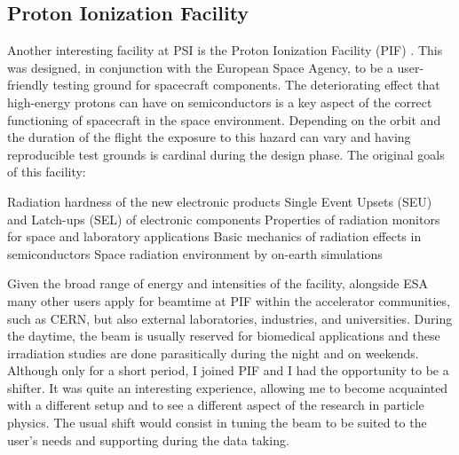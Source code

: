\begin{refsection}
\section{Proton Ionization Facility}
    Another interesting facility at PSI is the Proton Ionization Facility (PIF) \cite{PIF:1996}\cite{PIF:2001}.
    This was designed, in conjunction with the European Space Agency, to be a user-friendly testing ground for spacecraft components.
    The deteriorating effect that high-energy protons can have on semiconductors is a key aspect of the correct functioning of spacecraft in the space environment.
    Depending on the orbit and the duration of the flight the exposure to this hazard can vary and having reproducible test grounds is cardinal during the design phase. 
    The original goals of this facility:
    \begin{outline}
        \1 Radiation hardness of the new electronic products
        \1 Single Event Upsets (SEU) and Latch-ups (SEL) of electronic components
        \1 Properties of radiation monitors for space and laboratory applications
        \1 Basic mechanics of radiation effects in semiconductors
        \1 Space radiation environment by on-earth simulations
    \end{outline}
    Given the broad range of energy and intensities of the facility, alongside ESA many other users apply for beamtime at PIF within the accelerator communities, such as CERN, but also external laboratories, industries, and universities.
    During the daytime, the beam is usually reserved for biomedical applications and these irradiation studies are done parasitically during the night and on weekends.
    Although only for a short period, I joined PIF and I had the opportunity to be a shifter. 
    It was quite an interesting experience, allowing me to become acquainted with a different setup and to see a different aspect of the research in particle physics.
    The usual shift would consist in tuning the beam to be suited to the user's needs and supporting during the data taking.

\printbibliography[
    heading = bibliographychapter,
    title=Bibliography for the introduction
]

\end{refsection}